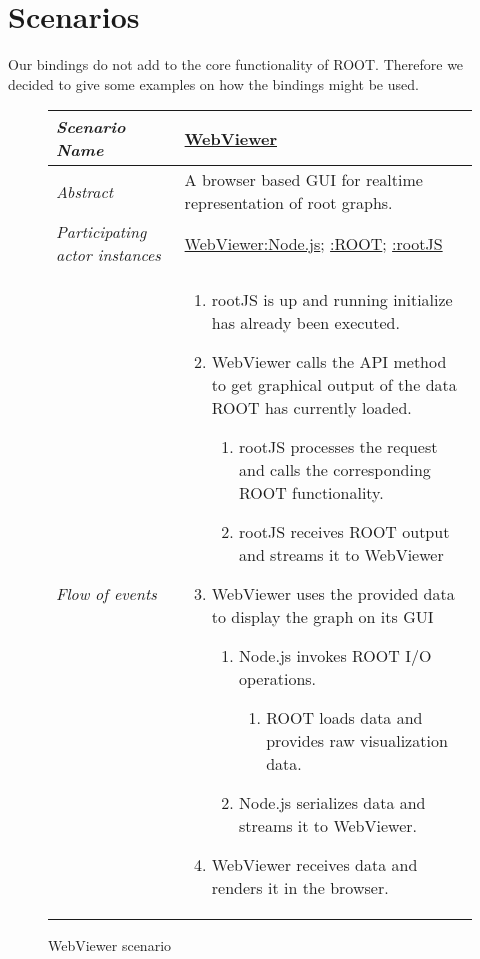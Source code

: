 \section{Scenarios}

Our bindings do not add to the core functionality of ROOT. Therefore 
we decided to give some examples on how the bindings might be used.

\begin{figure}[htb]
	\centering
	\begin{longtable}{p{3cm} @{\hskip 1cm} p{12cm}}
		\hline
		
		\textit{Scenario Name} & \underline{WebViewer}\\
		\hline
	
		\textit{Abstract} & A browser based GUI for realtime representation of root graphs.\\
		\hline
	
		\textit{Participating actor instances} & \underline{WebViewer:Node.js}; \underline{:ROOT}; \underline{:rootJS}\\
		\hline
	
		\textit{Flow of events} & 
		\begin{enumerate}
			\item rootJS is up and running initialize has already been executed.
			
			\item WebViewer calls the API method to get graphical output of the data ROOT has currently loaded.
				\begin{enumerate}
					\item rootJS processes the request and calls the corresponding ROOT functionality.
					\item rootJS receives ROOT output and streams it to WebViewer
				\end{enumerate}
			\item WebViewer uses the provided data to display the graph on its GUI
				\begin{enumerate}
					\item Node.js invokes ROOT I/O operations.
						\begin{enumerate}
							\item ROOT loads data and provides raw visualization data.
						\end{enumerate}
					\item Node.js serializes data and streams it to WebViewer.
				\end{enumerate}
			\item WebViewer receives data and renders it in the browser.
		\end{enumerate}
		\\
		\hline
		
	\end{longtable}
	
	\caption{WebViewer scenario}
	
\end{figure}

